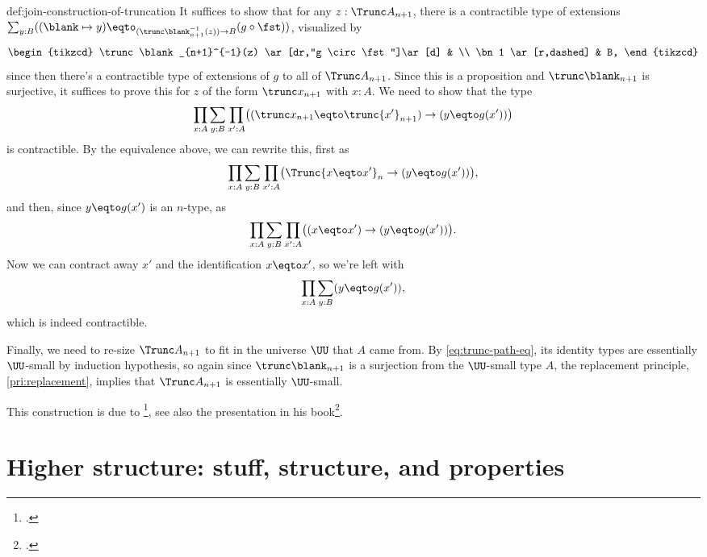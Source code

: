 \begin{implementation}{def:join-construction-of-truncation}
  It suffices to show that for any $z:\Trunc A_{n+1}$,
  there is a contractible type of extensions
  $\sum_{y:B}((\blank\mapsto y)
  \eqto_{(\trunc\blank_{n+1}^{-1}(z))\to B}(g \circ \fst))$,
  visualized by
  \[
    \begin{tikzcd}
      \trunc\blank_{n+1}^{-1}(z) \ar[dr,"g \circ \fst"]\ar[d] & \\
      \bn 1 \ar[r,dashed] & B,
    \end{tikzcd}
  \]
  since then there's a contractible type of extensions of $g$
  to all of $\Trunc A_{n+1}$.
  Since this is a proposition and $\trunc\blank_{n+1}$ is surjective,
  it suffices to prove this for $z$ of the form $\trunc x_{n+1}$ with $x:A$.
  We need to show that the type
  \[
    \prod_{x:A}\sum_{y:B}\prod_{x':A}
    \bigl((\trunc x_{n+1} \eqto \trunc {x'}_{n+1})
    \to (y \eqto g(x'))\bigr)
  \]
  is contractible.
  By the equivalence above, we can rewrite this, first as
  \[
    \prod_{x:A}\sum_{y:B}\prod_{x':A}
    \bigl(\Trunc{x\eqto x'}_n \to (y \eqto g(x'))\bigr),
  \]
  and then, since $y \eqto g(x')$ is an $n$-type, as
  \[
    \prod_{x:A}\sum_{y:B}\prod_{x':A}
    \bigl((x\eqto x') \to (y \eqto g(x'))\bigr).
  \]
  Now we can contract away $x'$ and the identification $x \eqto x'$,
  so we're left with
  \[
    \prod_{x:A}\sum_{y:B}(y \eqto g(x')),
  \]
  which is indeed contractible.

  Finally, we need to re-size $\Trunc A_{n+1}$ to fit in the universe
  $\UU$ that $A$ came from.
  By \eqref{eq:trunc-path-eq}, its identity types are essentially $\UU$-small
  by induction hypothesis, so again since $\trunc\blank_{n+1}$ is a surjection
  from the $\UU$-small type $A$, the replacement principle, \cref{pri:replacement},
  implies that $\Trunc A_{n+1}$ is essentially $\UU$-small.
\end{implementation}
This construction is due to \citeauthor{Rijke-Join}\footcite{Rijke-Join},
see also the presentation in his book\footcite{Rijke-Intro}.

\section{Higher structure: stuff, structure, and properties}
\label{sec:stuff-struct-prop}

